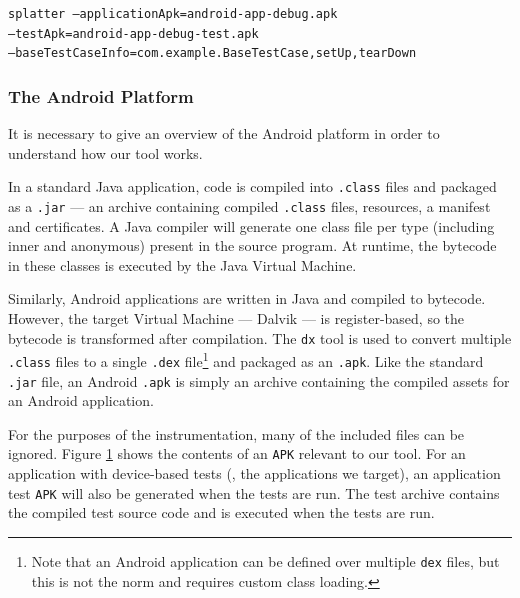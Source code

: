 \texttt{splatter --applicationApk=android-app-debug.apk\\--testApk=android-app-debug-test.apk\\--baseTestCaseInfo=com.example.BaseTestCase,setUp,tearDown}

\subsubsection{The Android Platform}

It is necessary to give an overview of the Android platform in order to understand how our \splatterinst{} tool works.

In a standard Java application, code is compiled into {\tt .class} files and packaged as a {\tt .jar} --- an archive containing compiled {\tt .class} files, resources, a manifest and certificates. A Java compiler will generate one class file per type (including inner and anonymous) present in the source program. At runtime, the bytecode in these classes is executed by the Java Virtual Machine.

Similarly, Android applications are written in Java and compiled to bytecode. However, the target Virtual Machine --- Dalvik --- is register-based, so the bytecode is transformed after compilation. The {\tt dx} tool is used to convert multiple {\tt .class} files to a single {\tt .dex} file\footnote{Note that an Android application can be defined over multiple {\tt dex} files, but this is not the norm and requires custom class loading.} and packaged as an {\tt .apk}. Like the standard {\tt .jar} file, an Android {\tt .apk} is simply an archive containing the compiled assets for an Android application.

For the purposes of the instrumentation, many of the included files can be ignored. Figure \ref{fig:android_apk} shows the contents of an {\tt APK} relevant to our tool. For an application with device-based tests (\ie, the applications we target), an application test {\tt APK} will also be generated when the tests are run. The test archive contains the compiled test source code and is executed when the tests are run.

\begin{figure}[h]
\caption{}
\label{fig:android_apk}
\end{figure}

